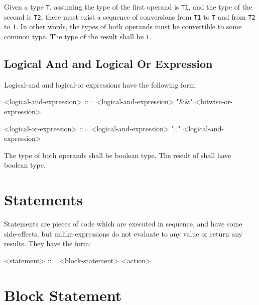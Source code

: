 Given a type \texttt{T}, assuming the type of the first operand is \texttt{T1}, and the type of the second is \texttt{T2}, there must exist a sequence of conversions from \texttt{T1} to \texttt{T} and from \texttt{T2} to \texttt{T}. In other words, the types of both operands must be convertible to some common type. The type of the result shall be \texttt{T}.

\subsection{Logical And and Logical Or Expression} \label{guide:logical_expr}

Logical-and and logical-or expressions have the following form:

\begin{minip}
\begin{grammar}
<logical-and-expression> ::= <logical-and-expression> "\&\&" <bitwise-or-expression>

<logical-or-expression> ::= <logical-and-expression> "||" <logical-and-expression>
\end{grammar}
\end{minip}

The type of both operands shall be boolean type. The result of shall have boolean type.

\section{Statements} \label{guide:statements}

Statements are pieces of code which are executed in sequence, and have some side-effects, but unlike expressions do not evaluate to any value or return any results. They have the form:

\begin{minip}
\begin{grammar}
<statement> ::=
     <block-statement>
\alt <action>
\end{grammar}
\end{minip}

\section{Block Statement} \label{guide:block_stmt}

